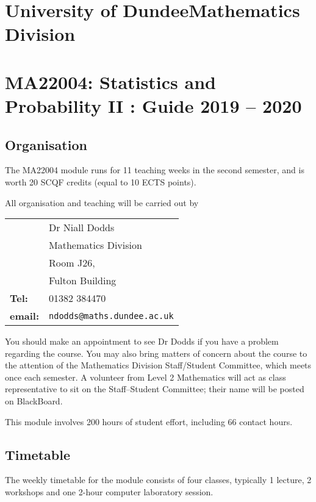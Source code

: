 \documentclass [11pt]{article}
\begin{document}
\section*{University of Dundee\hfill Mathematics Division}
\section*{MA22004: Statistics and Probability II : Guide 2019 -- 2020}

\subsection*{Organisation}

The MA22004 module runs for 11 teaching weeks in the second semester,
and is worth 20 SCQF credits (equal to 10 ECTS points).

 All organisation and teaching will be carried out by


\begin{table}[htbp]
\begin{tabular}{ll}
   & {Dr Niall Dodds}\\
 & Mathematics Division\\
 & Room J26,\\
 & Fulton Building\\

\textbf{Tel:}  & 01382 384470\\
\textbf{email:}  & \texttt{ndodds@maths.dundee.ac.uk}
\end{tabular}
\label{tab2}
\end{table}
You should make an appointment to see Dr
Dodds if you have a problem regarding the course.
You may also bring matters of concern about the course 
to the attention of the Mathematics Division Staff/Student Committee, which meets once each semester. 
A volunteer from Level 2 Mathematics will  act as class representative
to sit on the Staff--Student Committee; their name will be posted on BlackBoard.

This module involves 200 hours of student effort, including 66 
contact hours.

\vspace*{-0.25cm}

\subsection*{Timetable} 
The weekly timetable for the module consists of four classes, typically 
1 lecture, 2 workshops and one 2-hour computer laboratory session.
\end{document}
